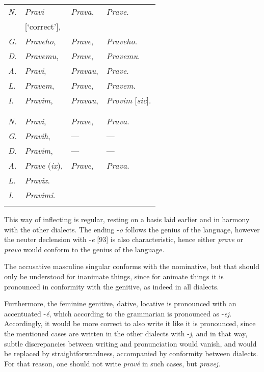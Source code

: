 \newpage

\begin{longtable}{ l l l l }    
    \lsptoprule
    \multicolumn{4}{ c }{Singular.} \\
    \midrule
    \textit{N}. & \textit{Pravi} & \textit{Prava}, & \textit{Prave}. \\
    & [‘correct’], & & \\
    \textit{G}. & \textit{Praveho}, & \textit{Prave}, & \textit{Praveho}. \\
    \textit{D}. & \textit{Pravemu}, & \textit{Prave}, & \textit{Pravemu}. \\
    \textit{A}. & \textit{Pravi}, & \textit{Pravau}, & \textit{Prave}. \\
    \textit{L}. & \textit{Pravem}, & \textit{Prave}, & \textit{Pravem}. \\
    \textit{I}. & \textit{Pravim}, & \textit{Pravau}, & \textit{Provim} [\textit{sic}]. \\
    \lspbottomrule
    \\
    \lsptoprule
    \multicolumn{4}{ c }{Plural.} \\
    \midrule
    \textit{N}. & \textit{Pravi}, & \textit{Prave}, & \textit{Prava}. \\
    \textit{G}. & \textit{Pravih}, & — & — \\
    \textit{D}. & \textit{Pravim}, & — & — \\
    \textit{A}. & \textit{Prave} (\textit{ix}), & \textit{Prave}, & \textit{Prava}. \\
    \textit{L}. & \textit{Pravix}. \\
    \textit{I}. & \textit{Pravimi}. \\
    \lspbottomrule
\end{longtable}

This way of inflecting is regular, resting on a basis laid earlier and in harmony with the other dialects. The ending -\textit{o} follows the genius of the language, however the neuter declension with -\textit{e} [93] is also characteristic, hence either \textit{prave} or \textit{pravo} would conform to the genius of the language.

The accusative masculine singular conforms with the nominative, but that should only be understood for inanimate things, since for animate things it is pronounced in conformity with the genitive, as indeed in all dialects.

Furthermore, the feminine genitive, dative, locative is pronounced with an accentuated -\textit{é}, which according to the grammarian is pronounced as -\textit{ej}. Accordingly, it would be more correct to also write it like it is pronounced, since the mentioned cases are written in the other dialects with -\textit{j}, and in that way, subtle discrepancies between writing and pronunciation would vanish, and would be replaced by straightforwardness, accompanied by conformity between dialects. For that reason, one should not write \textit{pravé} in such cases, but \textit{pravej}.

